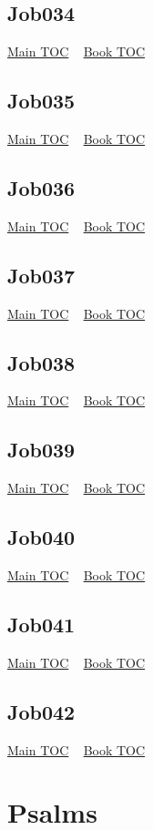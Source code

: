 \documentclass{book}
\begin{document}
  \section{Job034}\hyperlink{toc}{Main TOC} ~ \hyperref[subsec:Job]{Book TOC} 
  \section{Job035}\hyperlink{toc}{Main TOC} ~ \hyperref[subsec:Job]{Book TOC} 
  \section{Job036}\hyperlink{toc}{Main TOC} ~ \hyperref[subsec:Job]{Book TOC} 
  \section{Job037}\hyperlink{toc}{Main TOC} ~ \hyperref[subsec:Job]{Book TOC} 
  \section{Job038}\hyperlink{toc}{Main TOC} ~ \hyperref[subsec:Job]{Book TOC} 
  \section{Job039}\hyperlink{toc}{Main TOC} ~ \hyperref[subsec:Job]{Book TOC} 
  \section{Job040}\hyperlink{toc}{Main TOC} ~ \hyperref[subsec:Job]{Book TOC} 
  \section{Job041}\hyperlink{toc}{Main TOC} ~ \hyperref[subsec:Job]{Book TOC} 
  \section{Job042}\hyperlink{toc}{Main TOC} ~ \hyperref[subsec:Job]{Book TOC} 
  \chapter{Psalms} \label{subsec:Psa} \begin{multicols}{2} \minitoc \end{multicols}
\end{document}
